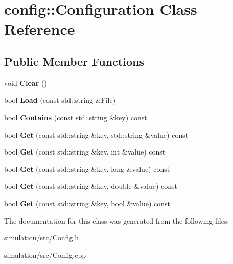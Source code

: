 \hypertarget{classconfig_1_1_configuration}{}\section{config\+:\+:Configuration Class Reference}
\label{classconfig_1_1_configuration}
\subsection*{Public Member Functions}
\begin{DoxyCompactItemize}
\item 
\mbox{\label{classconfig_1_1_configuration_a793f44d0706db6e3ce92bc024f772869}} 
void {\bfseries Clear} ()
\item 
\mbox{\label{classconfig_1_1_configuration_ac259be785f0656ead250ae257e95b0e3}} 
bool {\bfseries Load} (const std\+::string \&File)
\item 
\mbox{\label{classconfig_1_1_configuration_a51219b5a99dba44cc476d2910a2eec35}} 
bool {\bfseries Contains} (const std\+::string \&key) const
\item 
\mbox{\label{classconfig_1_1_configuration_a736adaece5e94d67416a752607c59698}} 
bool {\bfseries Get} (const std\+::string \&key, std\+::string \&value) const
\item 
\mbox{\label{classconfig_1_1_configuration_a34d6fdbec3fd5303aa27583c9c0deaba}} 
bool {\bfseries Get} (const std\+::string \&key, int \&value) const
\item 
\mbox{\label{classconfig_1_1_configuration_a0489785801f516f664f7a2609e1e69a1}} 
bool {\bfseries Get} (const std\+::string \&key, long \&value) const
\item 
\mbox{\label{classconfig_1_1_configuration_a7e1227efb413e823ab80384987076ffb}} 
bool {\bfseries Get} (const std\+::string \&key, double \&value) const
\item 
\mbox{\label{classconfig_1_1_configuration_addb88e4bc970862d58700bb16264662d}} 
bool {\bfseries Get} (const std\+::string \&key, bool \&value) const
\end{DoxyCompactItemize}


The documentation for this class was generated from the following files\+:\begin{DoxyCompactItemize}
\item 
simulation/src/\mbox{\hyperlink{_config_8h}{Config.\+h}}\item 
simulation/src/Config.\+cpp\end{DoxyCompactItemize}
